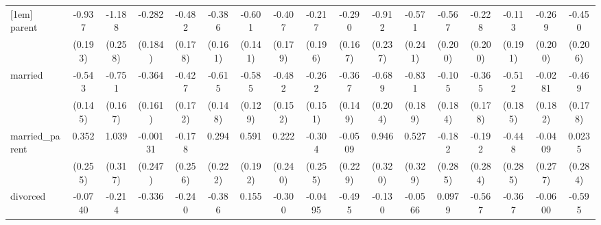{\begin{tabular}{l*{16}{c}}
[1em]
parent              &      -0.937\sym{***}&      -1.188\sym{***}&      -0.282         &      -0.482\sym{**} &      -0.386\sym{*}  &      -0.601\sym{***}&      -0.407\sym{*}  &      -0.217         &      -0.290         &      -0.912\sym{***}&      -0.571\sym{*}  &      -0.567\sym{**} &      -0.228         &      -0.113         &      -0.269         &      -0.450\sym{*}  \\
                    &     (0.193)         &     (0.258)         &     (0.184)         &     (0.178)         &     (0.161)         &     (0.141)         &     (0.179)         &     (0.196)         &     (0.167)         &     (0.237)         &     (0.241)         &     (0.200)         &     (0.200)         &     (0.191)         &     (0.200)         &     (0.206)         \\
[1em]
married             &      -0.543\sym{***}&      -0.751\sym{***}&      -0.364\sym{*}  &      -0.427\sym{*}  &      -0.615\sym{***}&      -0.585\sym{***}&      -0.482\sym{**} &      -0.262         &      -0.367\sym{*}  &      -0.689\sym{***}&      -0.831\sym{***}&      -0.105         &      -0.365\sym{*}  &      -0.512\sym{**} &     -0.0281         &      -0.469\sym{**} \\
                    &     (0.145)         &     (0.167)         &     (0.161)         &     (0.172)         &     (0.148)         &     (0.129)         &     (0.152)         &     (0.151)         &     (0.149)         &     (0.204)         &     (0.189)         &     (0.184)         &     (0.178)         &     (0.185)         &     (0.182)         &     (0.178)         \\
[1em]
married\_parent      &       0.352         &       1.039\sym{**} &    -0.00131         &      -0.178         &       0.294         &       0.591\sym{**} &       0.222         &      -0.304         &     -0.0509         &       0.946\sym{**} &       0.527         &      -0.182         &      -0.192         &      -0.448         &     -0.0409         &      0.0235         \\
                    &     (0.255)         &     (0.317)         &     (0.247)         &     (0.256)         &     (0.222)         &     (0.192)         &     (0.240)         &     (0.255)         &     (0.229)         &     (0.320)         &     (0.329)         &     (0.285)         &     (0.284)         &     (0.285)         &     (0.277)         &     (0.284)         \\
[1em]
divorced            &     -0.0740         &      -0.214         &      -0.336         &      -0.240         &      -0.386\sym{*}  &       0.155         &      -0.300         &     -0.0495         &      -0.495\sym{*}  &      -0.130         &     -0.0566         &      0.0979         &      -0.567\sym{*}  &      -0.367         &     -0.0600         &      -0.595\sym{*}  \\

\end{tabular}}
